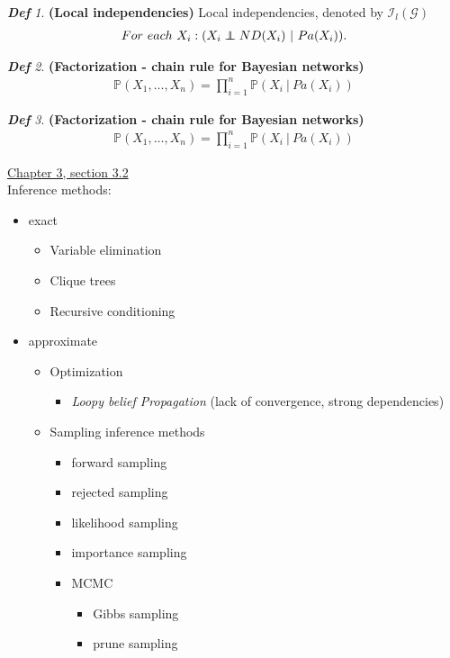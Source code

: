 \documentclass{amsart}
\newcommand\indep{\protect\mathpalette{\protect\independenT}{\perp}}
\def\independenT#1#2{\mathrel{\rlap{$#1#2$}\mkern2mu{#1#2}}}
\theoremstyle{plain}
\theoremstyle{remark}
\newtheorem*{definition*}{\textbf{\em Def}}
\theoremstyle{plain}
\renewcommand{\P}{{\mathbb P}}
\newcommand{\G}{{\mathcal G}}
\newcommand{\I}{{\mathcal{I}}}
\newcommand{\vs}{\vspace{0.75pc}}
\begin{document}
\begin{definition*}\textbf{ (Local independencies) }
Local independencies, denoted by $\I_l(\G)$
\begin{align*}
For\ each\ X_i: (X_i \indep ND(X_i)\ |\ Pa(X_i)).
\end{align*}
\end{definition*}\vs

\begin{definition*}\textbf{ (Factorization - chain rule for Bayesian networks) }
\begin{align*}
\P(X_1, \ldots , X_n) = \prod_{i=1}^n \P(X_i\ |\ Pa(X_i))
\end{align*}
\end{definition*}\vs

\begin{definition*}\textbf{ (Factorization - chain rule for Bayesian networks) }
\begin{align*}
\P(X_1, \ldots , X_n) = \prod_{i=1}^n \P(X_i\ |\ Pa(X_i))
\end{align*}
\end{definition*}\vs

\underline{Chapter 3, section 3.2} \\
Inference methods:
\begin{itemize}
\item exact
\begin{itemize}
\item Variable elimination
\item Clique trees
\item Recursive conditioning
\end{itemize}
\item approximate
\begin{itemize}
\item Optimization
\begin{itemize}
\item \textit{Loopy belief Propagation} (lack of convergence, strong dependencies)
\end{itemize}
\item Sampling inference methods
\begin{itemize}
\item forward sampling
\item rejected sampling
\item likelihood sampling
\item importance sampling
\item MCMC
\begin{itemize}
\item Gibbs sampling
\item prune sampling
\end{itemize}
\end{itemize}
\end{itemize}
\end{itemize}\vs
\end{document}
